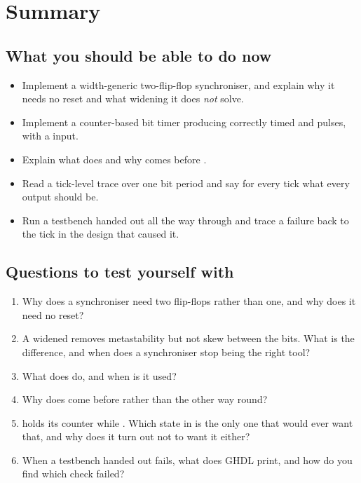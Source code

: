 
\section{Summary}
\label{c12:sec:review}

\subsection*{What you should be able to do now}
\begin{itemize}
  \item Implement a width-generic two-flip-flop synchroniser, and explain why it needs no reset and
    what widening it does \emph{not} solve.
  \item Implement a counter-based bit timer producing correctly timed  and
     pulses, with a  input.
  \item Explain what  does and why  comes before .
  \item Read a tick-level trace over one bit period and say for every tick what every output should
    be.
  \item Run a testbench handed out all the way through and trace a failure back to the tick in the
    design that caused it.
\end{itemize}

\subsection*{Questions to test yourself with}
\begin{enumerate}
  \item Why does a synchroniser need two flip-flops rather than one, and why does it need no reset?
  \item A widened  removes metastability but not skew between the bits. What is the
    difference, and when does a synchroniser stop being the right tool?
  \item What does  do, and when is it used?
  \item Why does  come before  rather than the other way round?
  \item {} holds its counter while . Which state in
     is the only one that would ever want that, and why does it turn out not to
    want it either?
  \item When a testbench handed out fails, what does GHDL print, and how do you find which check
    failed?
\end{enumerate}

